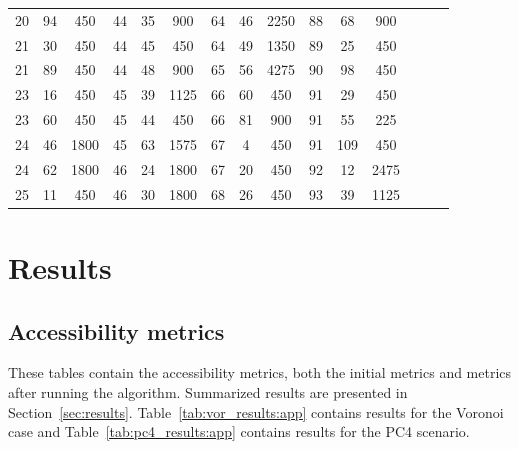 \begin{center}
\begin{tabular}{|c|c|c||c|c|c||c|c|c||c|c|c||c|c|c|}
        20         & 94         & 450        & 44         & 35         & 900        & 64         & 46         & 2250       & 88         & 68         & 900        &            &            &            \\
        21         & 30         & 450        & 44         & 45         & 450        & 64         & 49         & 1350       & 89         & 25         & 450        &            &            &            \\
        21         & 89         & 450        & 44         & 48         & 900        & 65         & 56         & 4275       & 90         & 98         & 450        &            &            &            \\
        23         & 16         & 450        & 45         & 39         & 1125       & 66         & 60         & 450        & 91         & 29         & 450        &            &            &            \\
        23         & 60         & 450        & 45         & 44         & 450        & 66         & 81         & 900        & 91         & 55         & 225        &            &            &            \\
        24         & 46         & 1800       & 45         & 63         & 1575       & 67         & 4          & 450        & 91         & 109        & 450        &            &            &            \\
        24         & 62         & 1800       & 46         & 24         & 1800       & 67         & 20         & 450        & 92         & 12         & 2475       &            &            &            \\
        25         & 11         & 450        & 46         & 30         & 1800       & 68         & 26         & 450        & 93         & 39         & 1125       &            &            &            \\
        \hline
    \end{tabular}
\end{center}

\chapter{Results}\label{app:results}

\section{Accessibility metrics}
These tables contain the accessibility metrics, both the initial metrics and metrics after running the algorithm. Summarized results are presented in Section~\ref{sec:results}. Table~\ref{tab:vor_results:app} contains results for the Voronoi case and Table~\ref{tab:pc4_results:app} contains results for the PC4 scenario.

